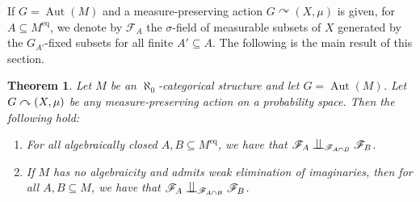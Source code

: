 \documentclass[11pt]{article}
\let\mathcal\mathscr
\let\actson\curvearrowright
\let\sub\subseteq
\theoremstyle{plain}
\newtheorem{theorem}{Theorem}[section]
\theoremstyle{definition}
\newcommand{\cF}{\mathcal{F}}
\DeclareMathOperator{\Aut}{Aut}
\newcommand{\eq}{^{\mathrm{eq}}}
\newcommand{\indep}[1][]{%
  \mathrel{
    \mathop{
      \scalebox{1}[1.3]{\text{$\perp\!\!\!\perp$}}
    }\displaylimits_{#1}
  }
}
\begin{document}
If $G = \Aut(M)$ and a measure-preserving action $G \actson (X, \mu)$ is given, for $A \sub M\eq$, we denote by $\cF_A$ the $\sigma$-field of measurable subsets of $X$ generated by the $G_{A'}$-fixed subsets for all finite $A' \sub A$. The following is the main result of this section.
\begin{theorem}
\label{th:general-independence}
Let $M$ be an $\aleph_0$-categorical structure and let $G = \Aut(M)$. Let $G \actson\nobreak (X, \mu)$ be any measure-preserving action on a probability space. Then the following hold:
\begin{enumerate}
\item \label{i:thgen:1} For all algebraically closed $A, B \sub M\eq$, we have that $\cF_A \indep[\cF_{A \cap B}] \cF_B$.

\item \label{i:thgen:2} If $M$ has no algebraicity and admits weak elimination of imaginaries, then for all $A, B \sub M$, we have that $\cF_A \indep[\cF_{A \cap B}] \cF_B$.
\end{enumerate}
\end{theorem}
\end{document}
